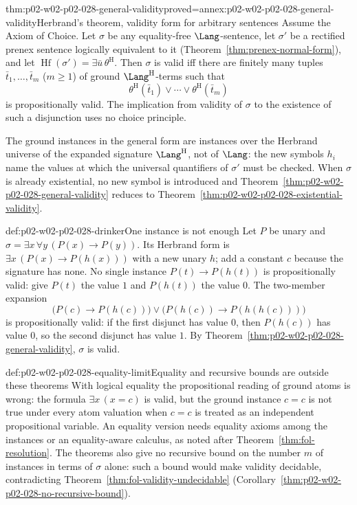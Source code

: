 \begin{hbtheorem}{thm:p02-w02-p02-028-general-validity}{proved=annex:p02-w02-p02-028-general-validity}{Herbrand's theorem, validity form for arbitrary sentences}
Assume the Axiom of Choice.  Let \(\sigma\) be any equality-free
\(\Lang\)-sentence, let \(\sigma'\) be a rectified prenex sentence logically
equivalent to it (Theorem~\ref{thm:prenex-normal-form}), and let
\(\operatorname{Hf}(\sigma')=\exists\bar u\,\theta^{\mathrm H}\).  Then
\(\sigma\) is valid iff there are finitely many tuples
\(\bar t_1,\ldots,\bar t_m\) (\(m\geq1\)) of ground
\(\Lang^{\mathrm H}\)-terms such that
\[
 \theta^{\mathrm H}(\bar t_1)\lor\cdots\lor\theta^{\mathrm H}(\bar t_m)
\]
is propositionally valid.  The implication from validity of \(\sigma\) to the
existence of such a disjunction uses no choice principle.
\end{hbtheorem}

The ground instances in the general form are instances over the Herbrand
universe of the expanded signature \(\Lang^{\mathrm H}\), not of \(\Lang\): the
new symbols \(h_i\) name the values at which the universal quantifiers of
\(\sigma'\) must be checked.  When \(\sigma\) is already existential, no new
symbol is introduced and Theorem~\ref{thm:p02-w02-p02-028-general-validity}
reduces to Theorem~\ref{thm:p02-w02-p02-028-existential-validity}.

\begin{hbexample}{def:p02-w02-p02-028-drinker}{One instance is not enough}
Let \(P\) be unary and \(\sigma=\exists x\,\forall y\,(P(x)\to P(y))\).  Its
Herbrand form is \(\exists x\,(P(x)\to P(h(x)))\) with a new unary \(h\); add
a constant \(c\) because the signature has none.  No single instance
\(P(t)\to P(h(t))\) is propositionally valid: give \(P(t)\) the value \(1\)
and \(P(h(t))\) the value \(0\).  The two-member expansion
\[
 \bigl(P(c)\to P(h(c))\bigr)\lor\bigl(P(h(c))\to P(h(h(c)))\bigr)
\]
is propositionally valid: if the first disjunct has value \(0\), then
\(P(h(c))\) has value \(0\), so the second disjunct has value \(1\).  By
Theorem~\ref{thm:p02-w02-p02-028-general-validity}, \(\sigma\) is valid.
\end{hbexample}

\begin{hbwarning}{def:p02-w02-p02-028-equality-limit}{Equality and recursive bounds are outside these theorems}
With logical equality the propositional reading of ground atoms is wrong: the
formula \(\exists x\,(x=c)\) is valid, but the ground instance \(c=c\) is not
true under every atom valuation when \(c=c\) is treated as an independent
propositional variable.  An equality version needs equality axioms among the
instances or an equality-aware calculus, as noted after
Theorem~\ref{thm:fol-resolution}.  The theorems also give no recursive bound
on the number \(m\) of instances in terms of \(\sigma\) alone: such a bound
would make validity decidable, contradicting
Theorem~\ref{thm:fol-validity-undecidable}
(Corollary~\ref{thm:p02-w02-p02-028-no-recursive-bound}).
\end{hbwarning}

